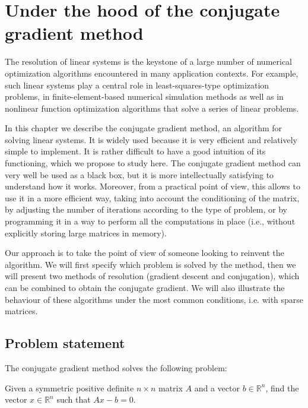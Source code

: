 \documentclass[notitlepage,oneside]{book}
\makeatletter
\newcommand{\authoredby}[1]{\addtocontents{toc}{\protect\@nameuse{authoredby#1}}}%
\makeatother
\begin{document}
\authoredby{A}
\chapter{Under the hood of the conjugate gradient method}
\fancyhead[R]{\textcolor{blue}{optional for reading}}


The resolution of linear systems is the keystone of a large number of numerical optimization algorithms encountered in many application contexts.
For example, such linear systems play a central role in least-squares-type optimization problems, in
finite-element-based numerical simulation methods as well as in nonlinear function optimization algorithms that solve a series of linear problems.

In this chapter we describe the conjugate gradient method, an algorithm for solving linear systems.
It is widely used because it is very efficient and relatively simple to implement.
It is rather difficult to have a good intuition of its functioning, which we propose to study here.
The conjugate gradient method can very well be used as a black box, but it is more intellectually satisfying to understand how it works.
Moreover, from a practical point of view, this allows to use it in a more efficient way, taking into account the conditioning of the matrix,
by adjusting the number of iterations according to the type of problem, or by programming it in a way to perform all the computations in place
(i.e., without explicitly storing large matrices in memory).

Our approach is to take the point of view of someone looking to reinvent the algorithm.
We will first specify which problem is solved by the method, then we will present two methods of resolution (gradient descent and conjugation),
which can be combined to obtain the conjugate gradient.
We will also illustrate the behaviour of these algorithms under the most common conditions, i.e. with sparse matrices.



\section{Problem statement}

The conjugate gradient method solves the following problem:

\begin{framed}
Given  a symmetric positive definite $n\times n$ matrix $A$ and a vector $b \in {\mathbb R}^n$, find the vector $x \in {\mathbb R}^n$ such that $Ax - b =0$.
\end{framed}
\end{document}
